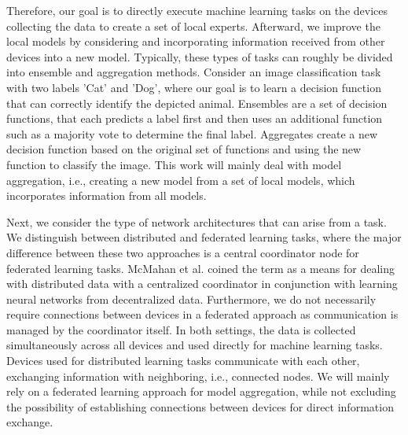 Therefore, our goal is to directly execute machine learning tasks on the devices collecting the data to create a set of local experts.
Afterward, we improve the local models by considering and incorporating information received from other devices into a new model.
Typically, these types of tasks can roughly be divided into ensemble and aggregation methods. 
Consider an image classification task with two labels 'Cat' and 'Dog', where our goal is to learn a decision function that can correctly identify the depicted animal.
Ensembles are a set of decision functions, that each predicts a label first and then uses an additional function such as a majority vote to determine the final label.
Aggregates create a new decision function based on the original set of functions and using the new function to classify the image.
This work will mainly deal with model aggregation, i.e., creating a new model from a set of local models, which incorporates information from all models.

Next, we consider the type of network architectures that can arise from a task. 
We distinguish between distributed and federated learning tasks, where the major difference between these two approaches is a central coordinator node for federated learning tasks.
McMahan et al. \cite{mcmahan2016communication} coined the term as a means for dealing with distributed data with a centralized coordinator in conjunction with learning neural networks from decentralized data.
Furthermore, we do not necessarily require connections between devices in a federated approach as communication is managed by the coordinator itself.
In both settings, the data is collected simultaneously across all devices and used directly for machine learning tasks.
Devices used for distributed learning tasks communicate with each other, exchanging information with neighboring, i.e., connected nodes.
We will mainly rely on a federated learning approach for model aggregation, while not excluding the possibility of establishing connections between devices for direct information exchange.


